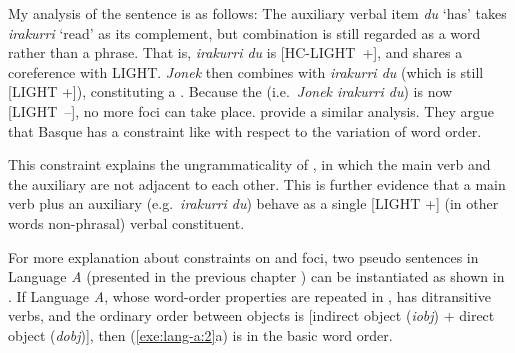 My analysis of the sentence is as follows: The auxiliary verbal item
\textit{du} `has' takes \textit{irakurri} `read' as its complement,
but combination is still regarded as a word rather than a phrase. That
is, \textit{irakurri du} is \mbox{[HC-LIGHT +]}, and
shares a coreference with LIGHT.  \textit{Jonek} then combines with
\textit{irakurri du} (which is still [LIGHT +]), constituting a
. Because the 
(i.e.\ \textit{Jonek irakurri du}) is now \mbox{[LIGHT --]}, no more
 foci can take place.  \citet{crowgey:bender:11}
provide a similar analysis. They argue that Basque has a constraint
like  with respect to the variation of word order.



\noindent This constraint explains the ungrammaticality of
, in which the main verb and the auxiliary are
not adjacent to each other. This is further evidence
that a main verb plus an auxiliary (e.g.\ \textit{irakurri du}) behave
as a single [LIGHT +] (in other words non-phrasal) verbal constituent.




For more explanation about constraints on  and  foci,
two pseudo sentences in Language \textit{A} (presented in the previous chapter
) can be instantiated as shown in . If
Language \textit{A}, whose word-order properties are repeated in
, has ditransitive verbs, and the ordinary
order between objects is [indirect object (\textit{iobj}) + direct
  object (\textit{dobj})], then (\ref{exe:lang-a:2}a) is in the basic
word order.


